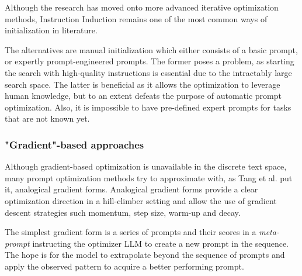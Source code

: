 Although the research has moved onto more advanced iterative optimization methods, Instruction Induction remains one of the 
most common ways of initialization in literature. 

The alternatives are manual initialization which 
either consists of a basic prompt, or expertly prompt-engineered prompts. 
The former poses a problem, as starting the search with high-quality instructions 
is essential due to the intractably large search space\cite{opsahlong2024optimizinginstructionsdemonstrationsmultistage}. 
The latter is beneficial as it allows the optimization to leverage human knowledge\cite{guo2024connectinglargelanguagemodels}, but
to an extent defeats the purpose of automatic prompt optimization. Also, it is impossible to have pre-defined expert prompts for tasks that are not known yet.

\subsubsection{"Gradient"-based approaches}
Although gradient-based optimization is unavailable in the discrete text space, many prompt optimization methods try to approximate with,
as Tang et al.\cite{tang2024unleashingpotentiallargelanguage} put it, analogical gradient forms. Analogical gradient forms provide a clear
optimization direction in a hill-climber setting and allow the use of gradient descent strategies such momentum, step size, warm-up and decay.

The simplest gradient form is a series of prompts and their scores in a \textit{meta-prompt} instructing the optimizer LLM
to create a new prompt in the sequence. The hope is for the model to extrapolate beyond the sequence of prompts
and apply the observed pattern to acquire a better performing prompt. 

